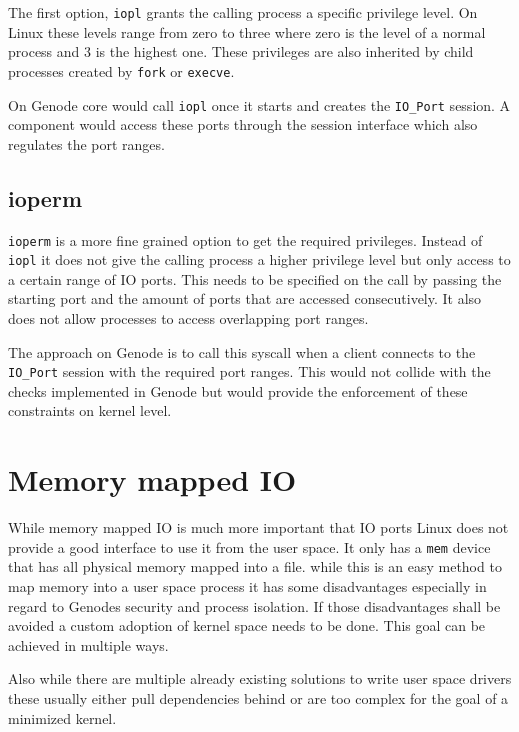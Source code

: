 \documentclass[
a4paper,
12pt,
notitlepage,
parskip=half,
DIV=11,
]{scrbook}
\begin{document}
		The first option, \texttt{iopl} grants the calling process a specific privilege level.
		On Linux these levels range from zero to three where zero is the level of a normal process and 3 is the highest one.
		These privileges are also inherited by child processes created by \texttt{fork} or \texttt{execve}. \citep{iopl}
		
		On Genode core would call \texttt{iopl} once it starts and creates the \texttt{IO\_Port} session.
		A component would access these ports through the session interface which also regulates the port ranges.
		
		\subsection{ioperm}
		
		\texttt{ioperm} is a more fine grained option to get the required privileges.
		Instead of \texttt{iopl} it does not give the calling process a higher privilege level but only access to a certain range of IO ports.
		This needs to be specified on the call by passing the starting port and the amount of ports that are accessed consecutively.
		It also does not allow processes to access overlapping port ranges. \citep{ioperm}
		
		The approach on Genode is to call this syscall when a client connects to the \texttt{IO\_Port} session with the required port ranges.
		This would not collide with the checks implemented in Genode but would provide the enforcement of these constraints on kernel level.
		
		\section{Memory mapped IO}
		
		While memory mapped IO is much more important that IO ports Linux does not provide a good interface to use it from the user space.
		It only has a \texttt{mem} device that has all physical memory mapped into a file.
		while this is an easy method to map memory into a user space process it has some disadvantages especially in regard to Genodes security and process isolation.
		If those disadvantages shall be avoided a custom adoption of kernel space needs to be done.
		This goal can be achieved in multiple ways.
		
		Also while there are multiple already existing solutions to write user space drivers these usually either pull dependencies behind or are too complex for the goal of a minimized kernel.
		
\end{document}
